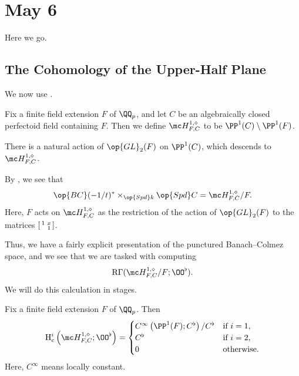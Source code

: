 \documentclass[../notes.tex]{subfiles}
\begin{document}
\section{May 6}
Here we go.

\subsection{The Cohomology of the Upper-Half Plane}
We now use .
\begin{definition}
	Fix a finite field extension $F$ of $\QQ_p$, and let $C$ be an algebraically closed perfectoid field containing $F$. Then we define $\mc H^{1,\diamond}_{F,C}$ to be $\PP^1(C)\setminus\PP^1(F)$.
\end{definition}
\begin{remark}
	There is a natural action of $\op{GL}_2(F)$ on $\PP^1(C)$, which descends to $\mc H^{1,\diamond}_{F,C}$.
\end{remark}
\begin{remark}
	By , we see that
	\[\op{BC}(-1/t)^*\times_{\op{Spd}k}\op{Spd}C=\mc H^{1,\diamond}_{F,C}/F.\]
	Here, $F$ acts on $\mc H^{1,\diamond}_{F,C}$ as the restriction of the action of $\op{GL}_2(F)$ to the matrices $\begin{bsmallmatrix}
		1 & x \\ & 1
	\end{bsmallmatrix}$.
\end{remark}
Thus, we have a fairly explicit presentation of the punctured Banach--Colmez space, and we see that we are tasked with computing
\[\mathrm R\Gamma(\mc H^{1,\diamond}_{F,C}/F;\OO^\flat).\]
We will do this calculation in stages.
\begin{lemma} \label{lem:upper-half-plane-cohomology}
	Fix a finite field extension $F$ of $\QQ_p$. Then
	\[\mathrm H^i_c\left(\mc H^{1,\diamond}_{F,C};\OO^\flat\right)=\begin{cases}
		C^\infty\left(\PP^1(F);C^\flat\right)/C^\flat & \text{if }i=1, \\
		C^\flat & \text{if }i=2, \\
		0 & \text{otherwise}.
	\end{cases}\]
	Here, $C^\infty$ means locally constant.
\end{lemma}
\end{document}
